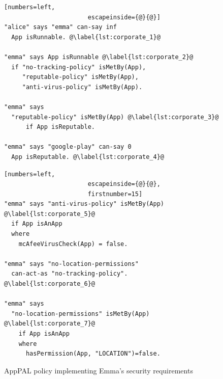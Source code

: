 \documentclass[]{llncs}
\begin{document}
\begin{figure}
  \begin{minipage}[t]{0.5\textwidth}
    \begin{lstlisting}[numbers=left,
                       escapeinside={@}{@}]
"alice" says "emma" can-say inf
  App isRunnable. @\label{lst:corporate_1}@

"emma" says App isRunnable @\label{lst:corporate_2}@
  if "no-tracking-policy" isMetBy(App),
     "reputable-policy" isMetBy(App),
     "anti-virus-policy" isMetBy(App).

"emma" says
  "reputable-policy" isMetBy(App) @\label{lst:corporate_3}@
      if App isReputable.

"emma" says "google-play" can-say 0
  App isReputable. @\label{lst:corporate_4}@
    \end{lstlisting}
  \end{minipage}\begin{minipage}[t]{0.5\textwidth}
    \begin{lstlisting}[numbers=left,
                       escapeinside={@}{@},
                       firstnumber=15]
"emma" says "anti-virus-policy" isMetBy(App) @\label{lst:corporate_5}@
  if App isAnApp
  where
    mcAfeeVirusCheck(App) = false.

"emma" says "no-location-permissions"
  can-act-as "no-tracking-policy". @\label{lst:corporate_6}@

"emma" says
  "no-location-permissions" isMetBy(App) @\label{lst:corporate_7}@
    if App isAnApp
    where
      hasPermission(App, "LOCATION")=false.
\end{lstlisting}
\end{minipage}
\caption{AppPAL policy implementing Emma's security requirements}
\label{lst:corporate}
\end{figure}
\end{document}
